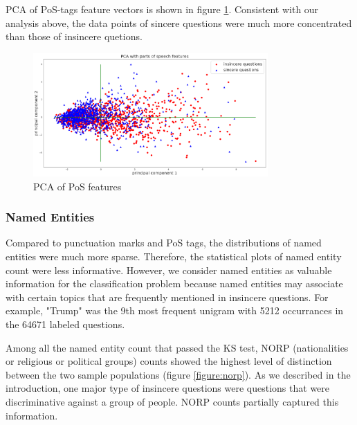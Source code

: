 \documentclass[12pt]{diazessay} %
\begin{document}
PCA of PoS-tags feature vectors is shown in figure \ref{figure:pospca}. Consistent with our analysis above, the data points of sincere questions were much more concentrated than those of insincere quetions.  

\begin{figure}[ht]
    \includegraphics[width=0.8\textwidth, center]{graphs/pca/2Dpos.png}
    
    \medskip
    \small
    \caption{PCA of PoS features} 
    \label{figure:pospca}
\end{figure}


\subsubsection{Named Entities} %
\label{ssub:named_entities}

Compared to punctuation marks and PoS tags, the distributions of named entities were much more sparse. Therefore, the statistical plots of named entity count were less informative. However, we consider named entities as valuable information for the classification problem because named entities may associate with certain topics that are frequently mentioned in insincere questions. For example, "Trump" was the 9th most frequent unigram with 5212 occurrances in the 64671 labeled questions. 

Among all the named entity count that passed the KS test, NORP (nationalities or religious or political groups) counts showed the highest level of distinction between the two sample populations (figure \ref{figure:norp}). As we described in the introduction, one major type of insincere questions were questions that were discriminative against a group of people. NORP counts partially captured this information. 
\end{document}
